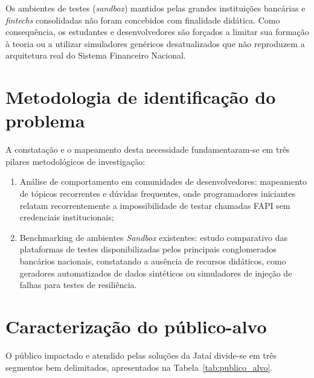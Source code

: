 \documentclass[
  12pt,
  openright,
  oneside,
  a4paper,
  brazilian
]{abntex2}
\newcommand{\sfn}{Sistema Financeiro Nacional}
\newcommand{\sandbox}{\textit{sandbox}}
\begin{document}
Os ambientes de testes (\sandbox{}) mantidos pelas grandes instituições bancárias e \textit{fintechs} consolidadas não foram concebidos com finalidade didática. Como consequência, os estudantes e desenvolvedores são forçados a limitar sua formação à teoria ou a utilizar simuladores genéricos desatualizados que não reproduzem a arquitetura real do \sfn{}.

\section{Metodologia de identificação do problema}
\label{sec:metodologia_identificacao}

A constatação e o mapeamento desta necessidade fundamentaram-se em três pilares metodológicos de investigação:

\begin{enumerate}
    \item{Análise de comportamento em comunidades de desenvolvedores:} mapeamento de tópicos recorrentes e dúvidas frequentes, onde programadores iniciantes relatam recorrentemente a impossibilidade de testar chamadas FAPI sem credenciais institucionais;
    \item{Benchmarking de ambientes \textit{Sandbox} existentes:} estudo comparativo das plataformas de testes disponibilizadas pelos principais conglomerados bancários nacionais, constatando a ausência de recursos didáticos, como geradores automatizados de dados sintéticos ou simuladores de injeção de falhas para testes de resiliência.
\end{enumerate}

\section{Caracterização do público-alvo}
\label{sec:publico_alvo}

O público impactado e atendido pelas soluções da Jataí divide-se em três segmentos bem delimitados, apresentados na Tabela~\ref{tab:publico_alvo}.
\end{document}
